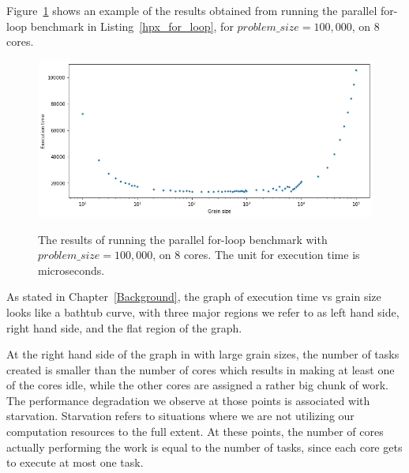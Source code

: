 
Figure~\ref{fig41} shows an example of the results obtained from running the parallel for-loop benchmark in Listing~\ref{hpx_for_loop}, for $problem\_size=100,000$, on 8 cores.
\begin{figure}[H]
	\centering
	{\includegraphics[scale=.45]{images/hpx_for_loop/100000_8.png}}
	\caption{The results of running the parallel for-loop benchmark with $problem\_size=100,000$, on 8 cores. The unit for execution time is microseconds.}\label{fig41}		
\end{figure}



As stated in Chapter~\ref{Background}, the graph of execution time vs grain size looks like a bathtub curve, with three major regions we refer to as left hand side, right hand side, and the flat region of the graph. 

At the right hand side of the graph in with large grain sizes, the number of tasks created is smaller than the number of cores which results in making at least one of the cores idle, while the other cores are assigned a rather big chunk of work. The performance degradation we observe at those points is associated with starvation. Starvation refers to situations where we are not utilizing our computation resources to the full extent. At these points, the number of cores actually performing the work is equal to the number of tasks, since each core gets to execute at most one task. 

